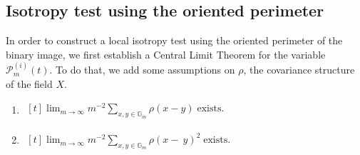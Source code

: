 \documentclass[12pt]{article}
\theoremstyle{Theorem}
\theoremstyle{definition}
\newcounter{Ax}
\newcommand{\itemA}{%
    \addtocounter{Ax}{1}
    \item[\textbf{A}\theAx.]}
\begin{document}
\subsection{Isotropy test using the oriented perimeter}
\label{isotest}
In order to construct a local isotropy test using the oriented perimeter of the binary image, we first  establish a Central Limit Theorem for the variable $\mathcal{P}^{\scriptscriptstyle (i)}_{m}(t)$. To do that, we add some assumptions on $\rho$, the covariance structure of the field $X$.
\begin{enumerate}
 \itemA
 $\begin{aligned}[t]
 \label{conditionTCL1}
\lim_{m \to \infty} m^{-2}\sum_{x, y \in \mathbb{G}_{m}}\rho(x-y)\; \text{exists}.
\end{aligned}$
\itemA $\begin{aligned}[t]
 \lim_{m \to \infty} m^{-2}\sum_{x, y \in \mathbb{G}_{m}}\rho(x-~y)^{2}\; \text{exists}.
\end{aligned}$
\end{enumerate} 
\end{document}
